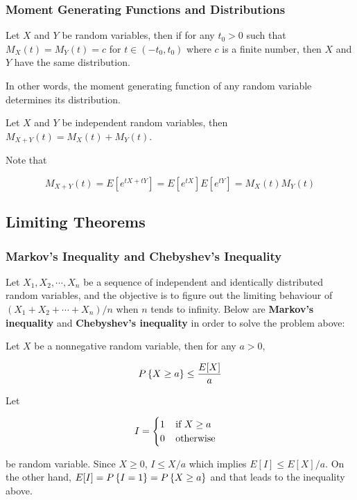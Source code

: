 \documentclass[a4paper,12pt]{article}
\begin{document}
\subsubsection{Moment Generating Functions and Distributions}
\begin{thm}
  Let $X$ and $Y$ be random variables, then if for any $t_{0}>0$ such that $M_{X}(t)=M_{Y}(t)=c$ for $t\in(-t_{0},t_{0})$ where $c$ is a finite number, then $X$ and $Y$ have the same distribution.
\end{thm}\n

In other words, the moment generating function of any random variable determines its distribution.\n

\begin{pst}
  Let $X$ and $Y$ be independent random variables, then $M_{X+Y}(t)=M_{X}(t)+M_{Y}(t)$.\n

  \prf Note that

  \propdisp

  $$M_{X+Y}(t)=E[e^{tX+tY}]=E[e^{tX}]E[e^{tY}]=M_{X}(t)M_{Y}(t)$$
\end{pst}

\subsection{Limiting Theorems}
\subsubsection{Markov's Inequality and Chebyshev's Inequality}
Let $X_{1},X_{2},\cdots,X_{n}$ be a sequence of independent and identically distributed random variables, and the objective is to figure out the limiting behaviour of $(X_{1}+X_{2}+\cdots+X_{n})/n$ when $n$ tends to infinity. Below are \textbf{Markov's inequality} and \textbf{Chebyshev's inequality} in order to solve the problem above:\n

\begin{thm}
  Let $X$ be a nonnegative random variable, then for any $a>0$,

  $$P\left\{ X\geq a\right\}\leq\frac{E[X]}{a}$$\s
  
  \prf Let

  $$I=\begin{cases}
    1\;\;\;\;\text{if }X\geq a\\
    0\;\;\;\;\text{otherwise}
  \end{cases}$$\s

  be random variable. Since $X\geq 0$, $I\leq X/a$ which implies $E[I]\leq E[X]/a$. On the other hand, $E[I]=P\left\{ I=1\right\}=P\left\{ X\geq a\right\}$ and that leads to the inequality above.
\end{thm}\n
\end{document}

